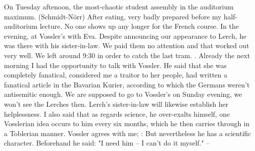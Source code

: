 
On Tuesday aftenoon, the most-chaotic student assembly in the auditorium maximum. (Schmidt-Nörr) After eating, very badly prepared before my half-auditorium lecture. No one shows up any longer for the French course. In the evening, at Vossler's with Eva. Despite announcing our appearance to Lerch, he was there with his sister-in-law. We paid them no attention and that worked out very well. We left around 9:30 in order to catch the last tram. . Already the next morning I had the opportunity to talk with Vossler. He said that she was completely fanatical, considered me a traitor to her people, had written a fanatical article in the Bavarian Kurier, according to which the Germans weren't antisemitic enough. We are supposed to go to Vossler's on Sunday evening, we won't see the Lerches then. Lerch's sister-in-law will likewise establish her helplessness. I also said that as regards science, he over-exalts himself, one Vosslerian idea occurs to him every six months, which he then carries through in a Toblerian manner. Vossler agrees with me; : But nevertheless he has a scientific character. Beforehand he said: "I need him -- I can't do it myself." --

